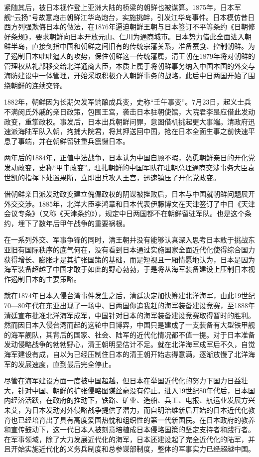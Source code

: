 \documentclass[12pt,UTF8]{ctexbook}
\begin{document}
紧随其后，被日本视作登上亚洲大陆的桥梁的朝鲜也被谋算。1875年，日本军舰“云扬”号故意炮击朝鲜江华岛炮台，实施挑衅，引发江华岛事件。日本模仿昔日西方列强欺侮日本的做法，在1876年逼迫朝鲜王朝与日本签订不平等条约《日朝修好条规》，要求朝鲜向日本开放元山、仁川为通商城市。日本势力借此全面进入朝鲜半岛，直接剑指中国和朝鲜之间旧有的传统宗藩关系，准备蚕食、控制朝鲜。为了遏制日本咄咄逼人的攻势，保住朝鲜这一传统藩属，清王朝在1879年将对朝鲜的管理权从礼部移交给北洋通商大臣，本质上属于将朝鲜事务纳入中国本国的外交与海防建设中一体管理，开始采取积极介入朝鲜事务的战略，此后中日两国开始了围绕朝鲜的连续交锋。

1882年，朝鲜因为长期欠发军饷酿成兵变，史称“壬午事变”。7月23日，起义士兵不满闵氏外戚的亲日政策，包围王宫，袭击日本驻朝使馆，大院君李昰应借此发动政变，重掌政权。事发后，日本出兵朝鲜问罪，意图借机挑起更大事端。清政府迅速派海陆军队入朝，拘捕大院君，将其押送回中国，抢在日本全面生事之前快速平息了事端，并在朝鲜留驻重兵震慑日本。

两年后的1884年，正值中法战争，日本认为中国自顾不暇，怂恿朝鲜亲日的开化党发动政变，史称“甲申政变”。驻扎朝鲜的中国军队在驻朝总理通商交涉事务大臣袁世凯的指挥下处置果断，立即出兵攻入王宫，迅速镇压了开化党政变。

借朝鲜亲日派发动政变建立傀儡政权的阴谋被挫败后，日本与中国就朝鲜问题展开外交交涉。1885年，北洋大臣李鸿章和日本代表伊藤博文在天津签订了中日《天津会议专条》（又称《天津条约》），规定中日两国都不在朝鲜留驻军队。也是这个条约，埋下了数年后甲午战争的重要祸根。

在一系列外交、军事争锋的同时，清王朝并没有能够认真深入思考日本敢于挑战东亚旧有国际秩序的底气何在，没有看到日本通过实施国家全面近代化使得综合国力获得增长、膨胀才是其扩张国策的基础，而是短视且一厢情愿地认为，日本是因为海军装备超越了中国才敢于如此的野心勃勃，于是将从海军装备建设上压制日本视作遏制日本的主要策略。

就在1874年日本入侵台湾事件发生之后，清廷决定加快筹建北洋海军，由此19世纪70—80年代在东亚出现了一场中、日两国你追我赶的海军装备建设竞赛，至1888年清廷宣布批准北洋海军成军，中国针对日本的海军装备建设竞赛取得暂时的胜利。然而因日本入侵台湾而起的这轮中日博弈，中国只是建成了一支装备有大型铁甲舰的海军舰队，其背后的国家、社会、陆军的近代化情况都不值一提。对于日本准备发动侵略战争的勃勃野心，清王朝明显估计不足。就在北洋海军成军后不久，自觉海军建设有成，自以为已经压制住日本的清王朝开始志得意满，逐渐放慢了北洋海军的发展速度，直到最后完全停止。

尽管在海军建设方面一度被中国超越，但日本在举国近代化的努力下国力日益壮大，针对中国、朝鲜的扩张侵略图谋丝毫没有停止。进入19世纪80年代后，日本国内经济活跃，在政府的推动下，铁路、矿业、造船、兵工、电报、航运业发展方兴未艾，为日本发动对外侵略战争提供了潜力，而自明治维新后开始的日本近代化教育也已经培育出了具有高度爱国热忱和组织性的第一代新国民。在日本政府的教养和宣传鼓动下，这一代日本人被刻意培植成日本侵略国策的坚定支持者和践行者。在军事领域，除了大力发展近代化的海军，日本还建设起了完全近代化的陆军，并且开始实施近代化的义务兵制度和总参谋部制度，整体的军事实力已经超越中国。
\end{document}

